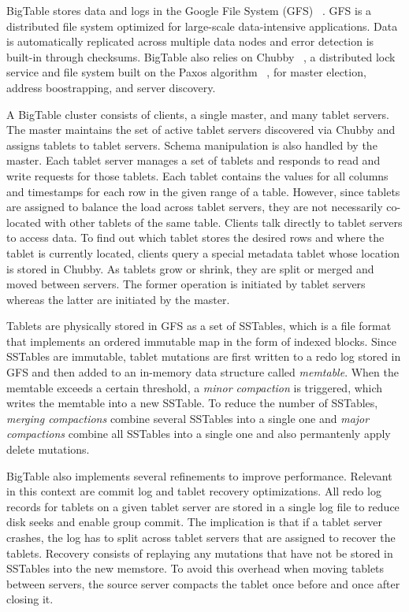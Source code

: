 \documentclass[10pt,final,journal]{IEEEtran}
\begin{document}
BigTable stores data and logs in the Google File System (GFS) ~\cite{Ghemawat:2003:GFS:1165389.945450}. GFS is a distributed file system optimized for large-scale data-intensive applications. Data is automatically replicated across multiple data nodes and error detection is built-in through checksums. BigTable also relies on Chubby ~\cite{Burrows:2006}, a distributed lock service and file system built on the Paxos algorithm ~\cite{Lamport:1998:PP:279227.279229, Lamport:2001:PMS}, for master election, address boostrapping, and server discovery.

A BigTable cluster consists of clients, a single master, and many tablet servers. The master maintains the set of active tablet servers discovered via Chubby and assigns tablets to tablet servers. Schema manipulation is also handled by the master. Each tablet server manages a set of tablets and responds to read and write requests for those tablets. Each tablet contains the values for all columns and timestamps for each row in the given range of a table. However, since tablets are assigned to balance the load across tablet servers, they are not necessarily co-located with other tablets of the same table. Clients talk directly to tablet servers to access data. To find out which tablet stores the desired rows and where the tablet is currently located, clients query a special metadata tablet whose location is stored in Chubby. As tablets grow or shrink, they are split or merged and moved between servers. The former operation is initiated by tablet servers whereas the latter are initiated by the master.

Tablets are physically stored in GFS as a set of SSTables, which is a file format that implements an ordered immutable map in the form of indexed blocks. Since SSTables are immutable, tablet mutations are first written to a redo log stored in GFS and then added to an in-memory data structure called \emph{memtable}. When the memtable exceeds a certain threshold, a \emph{minor compaction} is triggered, which writes the memtable into a new SSTable. To reduce the number of SSTables, \emph{merging compactions} combine several SSTables into a single one and \emph{major compactions} combine all SSTables into a single one and also permantenly apply delete mutations.

BigTable also implements several refinements to improve performance. Relevant in this context are commit log and tablet recovery optimizations. All redo log records for tablets on a given tablet server are stored in a single log file to reduce disk seeks and enable group commit. The implication is that if a tablet server crashes, the log has to split across tablet servers that are assigned to recover the tablets. Recovery consists of replaying any mutations that have not be stored in SSTables into the new memstore. To avoid this overhead when moving tablets between servers, the source server compacts the tablet once before and once after closing it.
\end{document}
